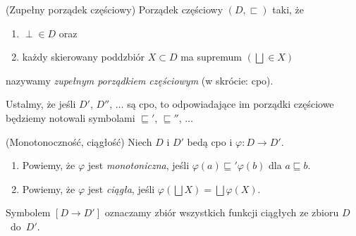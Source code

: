 \begin{definicja}(Zupełny porządek częściowy)%
Porządek częściowy \((D,\sqsubset)\) taki, że
\begin{enumerate}
  \item \(\perp\in D\) oraz
  \item każdy skierowany poddzbiór \(X\subset D\) ma supremum \((\bigsqcup \in X)\)
\end{enumerate}
nazywamy \emph{zupełnym porządkiem częściowym} (w skrócie: cpo).
\end{definicja}

Ustalmy, że jeśli \(D'\), \(D''\), \(\dots\)  są cpo, to odpowiadające im porządki częściowe będziemy notowali symbolami \(\sqsubseteq'\), \(\sqsubseteq''\), \(\dots\)

\begin{definicja}(Monotonoczność, ciągłość)\label{def:m_cont}%
Niech \(D\) i \(D'\) bedą cpo i \(\varphi: D\to D'\).
\begin{enumerate}
\item Powiemy, że \(\varphi\) jest \emph{monotoniczna}, jeśli \(\varphi(a) \sqsubseteq' \varphi(b)\) dla \(a\sqsubseteq b\).
\item Powiemy, że \(\varphi\) jest \emph{ciągła}, jeśli \(\varphi(\bigsqcup X) = \bigsqcup \varphi (X).\)\label{def:m_cont_2}
\end{enumerate}
Symbolem \([D\to D']\) oznaczamy zbiór wszystkich funkcji ciągłych ze zbioru \(D\)~do~\(D'\).
\end{definicja}

